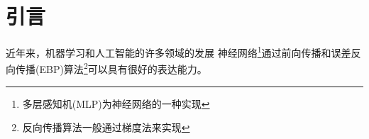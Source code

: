 
\chapter{引言}
\label{chap:introduction}

近年来，机器学习和人工智能的许多领域的发展
神经网络\footnote{多层感知机(MLP)为神经网络的一种实现}通过前向传播和误差反向传播(EBP)算法\footnote{反向传播算法一般通过梯度法来实现}可以具有很好的表达能力。

